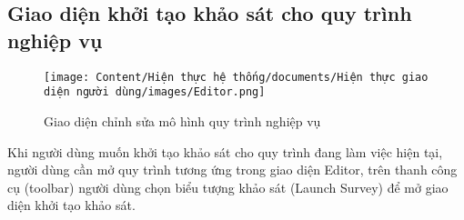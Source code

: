 \subsection{Giao diện khởi tạo khảo sát cho quy trình nghiệp vụ}

\begin{figure}[H]
    \centering
    \texttt{[image: Content/Hiện thực hệ thống/documents/Hiện thực giao diện người dùng/images/Editor.png]}
    \vspace{0.5cm}
    \caption{Giao diện chỉnh sửa mô hình quy trình nghiệp vụ}
    \label{fig: Giao diện chỉnh sửa mô hình quy trình nghiệp vụ}
\end{figure}

Khi người dùng muốn khởi tạo khảo sát cho quy trình đang làm việc hiện tại, người dùng cần mở quy trình tương ứng trong giao diện Editor, trên thanh công cụ (toolbar) người dùng chọn biểu tượng khảo sát (Launch Survey) để mở giao diện khởi tạo khảo sát.